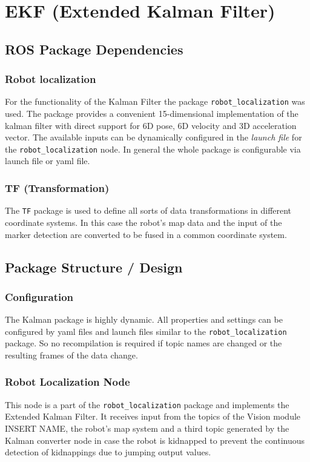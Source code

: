 \chapter{EKF (Extended Kalman Filter)}
\section{ROS Package Dependencies}
\subsection{Robot localization}
For the functionality of the Kalman Filter the package \texttt{robot\_localization} was used. The package provides a convenient 15-dimensional implementation of the kalman filter with direct support for 6D pose, 6D velocity and 3D acceleration vector. The available inputs can be dynamically configured in the \textit{launch file} for the \texttt{robot\_localization} node. In general the whole package is configurable via launch file or yaml file.

\subsection{TF (Transformation)}
The \texttt{TF} package is used to define all sorts of data transformations in different coordinate systems. In this case the robot's map data and the input of the marker detection are converted to be fused in a common coordinate system. 

\section{Package Structure / Design}
\subsection{Configuration}
The Kalman package is highly dynamic. All properties and settings can be configured by yaml files and launch files similar to the \texttt{robot\_localization} package. So no recompilation is required if topic names are changed or the resulting frames of the data change.

\subsection{Robot Localization Node}
This node is a part of the \texttt{robot\_localization} package and implements the Extended Kalman Filter. It receives input from the topics of the Vision module INSERT NAME, the robot's map system and a third topic generated by the Kalman converter node in case the robot is kidnapped to prevent the continuous detection of kidnappings due to jumping output values.

